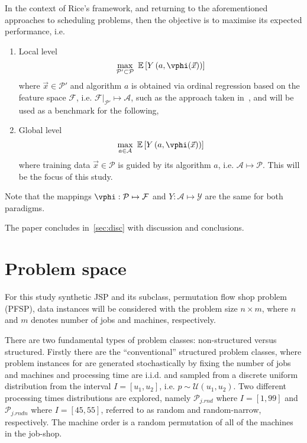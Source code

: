 \documentclass{acm_proc_article-sp}
\begin{document}
In the context of Rice's framework, and returning to the aforementioned approaches to scheduling problems, then the objective is to maximise its expected performance, i.e.
\begin{enumerate} 
\item Local level 
\begin{equation}
\max_{\mathcal{P}'\subset\mathcal{P}}~\mathbb{E}\left[Y\left(a,\vphi(\vec{x})\right)\right]
\end{equation}
where $\vec{x}\in\mathcal{P}'$ and algorithm $a$ is obtained via ordinal regression based on the feature space $\mathcal{F}$, i.e. $\mathcal{F}|_{\mathcal{P}'}\mapsto\mathcal{A}$, such as the approach taken in~\cite{InRu11a}, and  will be used as a benchmark for the following,  
\item  Global level
\begin{equation}
\max_{a\in\mathcal{A}}~\mathbb{E}\left[Y\left(a,\vphi(\vec{x})\right)\right]
\end{equation}
where training data $\vec{x}\in\mathcal{P}$ is guided by its algorithm $a$, i.e. $\mathcal{A}\mapsto\mathcal{P}$. This will be the focus of this study.
\end{enumerate}
Note that the mappings $\vphi:\mathcal{P}\mapsto\mathcal{F}$ and $Y:\mathcal{A}\mapsto\mathcal{Y}$ are the same for both paradigms.

The paper concludes in~\cref{sec:disc} with discussion and conclusions.









\section{Problem space}\label{sec:data}
For this study synthetic JSP and its subclass, permutation flow shop problem (PFSP), data instances will be considered with the problem size $n\times m$, where $n$ and $m$ denotes  number of jobs and machines, respectively. 

There are two fundamental types of problem classes: non-structured versus structured. 
Firstly there are the ``conventional'' structured problem classes, where problem instances for are generated stochastically by fixing the number of jobs and machines and processing time are i.i.d. and sampled from a discrete uniform distribution from the interval $I=[u_1,u_2]$, i.e. $p\sim \mathcal{U}(u_1,u_2)$.
Two different processing times distributions are explored, namely 
$\mathcal{P}_{j.rnd}$ where $I=[1,99]$ and $\mathcal{P}_{j.rndn}$ where $I=[45,55]$, referred to as random and random-narrow, respectively.
The machine order is a random permutation of all of the machines in the job-shop. 
\end{document}
